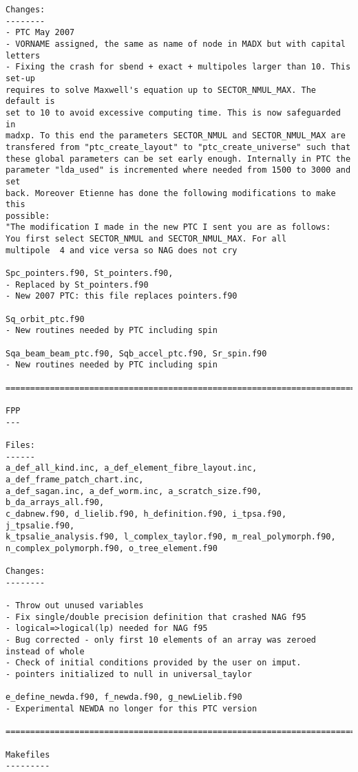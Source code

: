 \begin{verbatim}
Changes:
--------
- PTC May 2007
- VORNAME assigned, the same as name of node in MADX but with capital letters
- Fixing the crash for sbend + exact + multipoles larger than 10. This set-up
requires to solve Maxwell's equation up to SECTOR_NMUL_MAX. The default is
set to 10 to avoid excessive computing time. This is now safeguarded in
madxp. To this end the parameters SECTOR_NMUL and SECTOR_NMUL_MAX are
transfered from "ptc_create_layout" to "ptc_create_universe" such that
these global parameters can be set early enough. Internally in PTC the
parameter "lda_used" is incremented where needed from 1500 to 3000 and set
back. Moreover Etienne has done the following modifications to make this
possible:
"The modification I made in the new PTC I sent you are as follows:
You first select SECTOR_NMUL and SECTOR_NMUL_MAX. For all
multipole  4 and vice versa so NAG does not cry

Spc_pointers.f90, St_pointers.f90, 
- Replaced by St_pointers.f90
- New 2007 PTC: this file replaces pointers.f90

Sq_orbit_ptc.f90
- New routines needed by PTC including spin

Sqa_beam_beam_ptc.f90, Sqb_accel_ptc.f90, Sr_spin.f90
- New routines needed by PTC including spin

=============================================================================

FPP
---

Files:
------
a_def_all_kind.inc, a_def_element_fibre_layout.inc, a_def_frame_patch_chart.inc,
a_def_sagan.inc, a_def_worm.inc, a_scratch_size.f90, b_da_arrays_all.f90,
c_dabnew.f90, d_lielib.f90, h_definition.f90, i_tpsa.f90, j_tpsalie.f90,
k_tpsalie_analysis.f90, l_complex_taylor.f90, m_real_polymorph.f90, 
n_complex_polymorph.f90, o_tree_element.f90

Changes:
--------

- Throw out unused variables
- Fix single/double precision definition that crashed NAG f95
- logical=>logical(lp) needed for NAG f95
- Bug corrected - only first 10 elements of an array was zeroed instead of whole
- Check of initial conditions provided by the user on imput.
- pointers initialized to null in universal_taylor

e_define_newda.f90, f_newda.f90, g_newLielib.f90
- Experimental NEWDA no longer for this PTC version

=============================================================================

Makefiles
---------


\end{verbatim}
